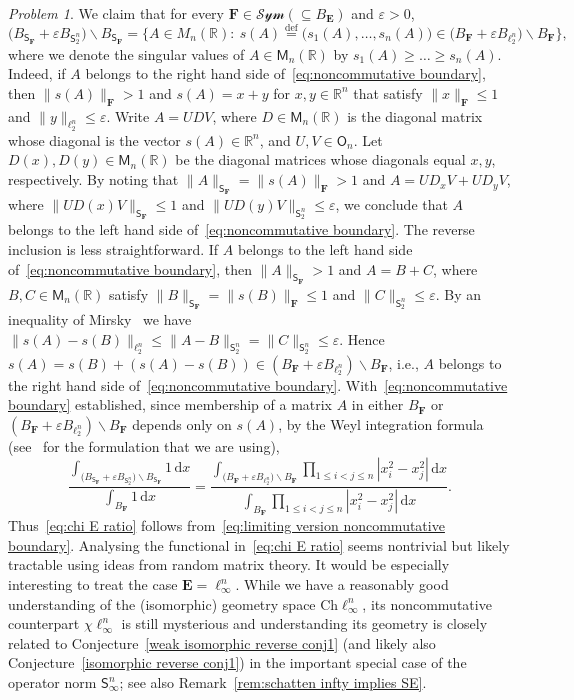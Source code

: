 \documentclass[11pt,reqno]{amsart}
\renewcommand{\le}{\leqslant}
\renewcommand{\ge}{\geqslant}
\renewcommand{\setminus}{\smallsetminus}
\newcommand{\ud}[0]{\,\mathrm{d}}
\newcommand{\e}{\varepsilon}
\newcommand{\R}{\mathbb R}
\theoremstyle{remark}
\newtheorem{problem}[theorem]{Problem}
\newcommand{\M}{\mathsf{M}}
\newcommand{\sfS}{\mathsf{S}}
\renewcommand{\subset}{\subseteq}
\newcommand{\eqdef}{\stackrel{\mathrm{def}}{=}}
\newcommand{\Ch}{\mathrm{Ch}}
\renewcommand{\1}{\mathbf 1}
\newcommand{\bfE}{\mathbf{E}}
\newcommand{\bfF}{\mathbf{F}}
\begin{document}
\begin{problem}
We claim that for every $\bfF\in \mathcal{Sym}(\subset B_\bfE)$ and $\e>0$,
\begin{equation}\label{eq:noncommutative boundary}
\big(B_{\sfS_\bfF}+\e B_{\sfS_2^n}\big)\setminus B_{\sfS_\bfF}=\Big\{A\in M_n(\R):\ s(A)\eqdef \big(s_1(A),\ldots,s_n(A)\big)\in \big(B_\bfF+\e B_{\ell_2^n}\big)\setminus B_\bfF\Big\},
\end{equation}
where  we denote the singular values of $A\in \M_n(\R)$ by $s_1(A)\ge\ldots\ge s_n(A)$. Indeed, if $A$ belongs to the right hand side of~\eqref{eq:noncommutative boundary}, then $\|s(A)\|_\bfF>1$ and $s(A)=x+y$  for $x,y\in \R^n$ that satisfy $\|x\|_\bfF\le 1$ and $\|y\|_{\ell_2^n}\le \e$. Write $A=UDV$, where  $D\in \M_n(\R)$ is the diagonal matrix whose diagonal is the vector $s(A)\in \R^n$, and $U,V\in \mathsf{O}_n$. Let $D(x),D(y)\in \M_n(\R)$ be the diagonal matrices whose diagonals equal $x,y$, respectively. By noting that $\|A\|_{\sfS_\bfF}=\|s(A)\|_{\bfF}>1$ and $A=UD_xV+UD_yV$, where  $\|UD(x)V\|_{\sfS_\bfF}\le 1$ and $\|UD(y)V\|_{\sfS_2^n}\le \e$, we conclude that $A$ belongs to the left hand side of~\eqref{eq:noncommutative boundary}. The reverse inclusion is less straightforward. If $A$ belongs to the left hand side of~\eqref{eq:noncommutative boundary}, then $\|A\|_{\sfS_\bfF}>1$ and $A=B+C$, where $B,C\in \M_n(\R)$ satisfy $\|B\|_{\sfS_{\bfF}}=\|s(B)\|_{\bfF}\le 1$ and $\|C\|_{\sfS_2^n}\le \e$. By an inequality of Mirsky~\cite{Mir60} we have
$\|s(A)-s(B)\|_{\ell_2^n}\le \|A-B\|_{\sfS_2^n}=\|C\|_{\sfS_2^n}\le \e.
$
 Hence $s(A)=s(B)+(s(A)-s(B))\in  (B_\bfF+\e B_{\ell_2^n})\setminus B_\bfF$, i.e., $A$ belongs to the right hand side of~\eqref{eq:noncommutative boundary}. With~\eqref{eq:noncommutative boundary} established, since membership of a matrix $A$ in either $B_\bfF$ or $(B_\bfF+\e B_{\ell_2^n})\setminus B_\bfF$ depends only on $s(A)$, by  the Weyl integration formula~\cite{Wey39} (see~\cite[Proposition~4.1.3]{AGZ10} for the formulation that we are using),
$$
\frac{\int_{\big(B_{\sfS_\bfF}+\e B_{\sfS_2^n}\big)\setminus B_{\sfS_\bfF}}1\ud x}{\int_{B_{\bfF}}1\ud x}=\frac{\int_{\big(B_\bfF+\e B_{\ell_2^n}\big)\setminus B_\bfF} \prod_{1\le i<j\le n} |x_i^2-x_j^2|\ud x}{\int_{B_\bfF} \prod_{1\le i<j\le n} |x_i^2-x_j^2|\ud x}.
$$
Thus~\eqref{eq:chi E ratio} follows from~\eqref{eq:limiting version noncommutative boundary}. Analysing the functional in~\eqref{eq:chi E ratio} seems nontrivial but likely tractable using ideas from random matrix theory. It would be especially interesting to treat the case $\bfE =\ell_\infty^n$. While we have a reasonably good understanding of the (isomorphic) geometry space $\Ch\ell_\infty^n$, its noncommutative counterpart $\chi \ell_\infty^n$ is still mysterious and understanding its geometry is closely related to Conjecture~\ref{weak isomorphic reverse conj1} (and likely also Conjecture~\ref{isomorphic reverse conj1}) in the important special case of the operator norm $\sfS_\infty^n$; see also Remark~\ref{rem:schatten infty implies SE}.
\end{problem}
\end{document}
